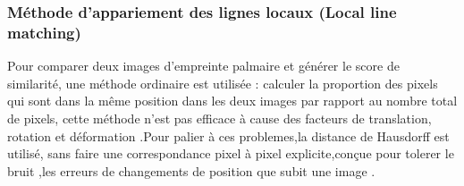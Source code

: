 {{\subsubsection{Méthode d’appariement des lignes locaux (Local line matching)}
Pour comparer deux images d’empreinte palmaire et générer le score de similarité, une méthode ordinaire est utilisée : calculer la proportion des pixels qui sont dans la même position dans les deux images par rapport au nombre total de pixels, cette méthode n’est pas efficace à cause des facteurs de translation, rotation et déformation \citep{zhang2012comparative}.Pour palier à ces problemes,la distance de Hausdorff est utilisé, sans faire une correspondance pixel à pixel explicite,conçue pour tolerer le bruit ,les erreurs de changements de position que subit une image \citep{rucklidge1997efficiently}.

}}
